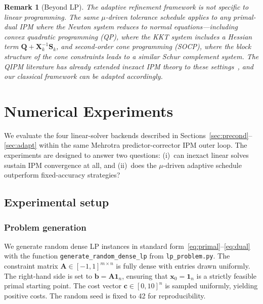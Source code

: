 \documentclass[11pt,twoside]{article}
\newtheorem{remark}{Remark}[section]
\newcommand{\bA}{\mathbf{A}}
\newcommand{\bb}{\mathbf{b}}
\newcommand{\bc}{\mathbf{c}}
\newcommand{\bx}{\mathbf{x}}
\newcommand{\bQ}{\mathbf{Q}}
\newcommand{\bS}{\mathbf{S}}
\newcommand{\bX}{\mathbf{X}}
\begin{document}
\begin{remark}[Beyond LP]
  The adaptive refinement framework is not specific to linear programming.
  The same $\mu$-driven tolerance schedule applies to any primal-dual IPM
  where the Newton system reduces to normal equations---including convex
  quadratic programming (QP), where the KKT system includes a Hessian term
  $\bQ + \bX_k^{-1}\bS_k$, and second-order cone programming (SOCP), where
  the block structure of the cone constraints leads to a similar Schur
  complement system.  The QIPM literature has already extended inexact
  IPM theory to these settings~\cite{Kerenidis2020}, and our classical
  framework can be adapted accordingly.
\end{remark}

\section{Numerical Experiments}
\label{sec:experiments}

We evaluate the four linear-solver backends described in
Sections~\ref{sec:precond}--\ref{sec:adapt} within the same Mehrotra
predictor-corrector IPM outer loop.  The experiments are designed to
answer two questions: (i)~can inexact linear solves sustain IPM
convergence at all, and (ii)~does the $\mu$-driven adaptive schedule
outperform fixed-accuracy strategies?

\subsection{Experimental setup}

\subsubsection{Problem generation}

We generate random dense LP instances in standard
form~\eqref{eq:primal}--\eqref{eq:dual} with the function
\texttt{generate\_random\_dense\_lp} from \texttt{lp\_problem.py}.  The
constraint matrix $\bA \in [-1,1]^{m \times n}$ is fully dense with
entries drawn uniformly.  The right-hand side is set to
$\bb = \bA\mathbf{1}_n$, ensuring that $\bx_0 = \mathbf{1}_n$ is a
strictly feasible primal starting point.  The cost vector
$\bc \in [0,10]^n$ is sampled uniformly, yielding positive costs.  The
random seed is fixed to 42 for reproducibility.
\end{document}
